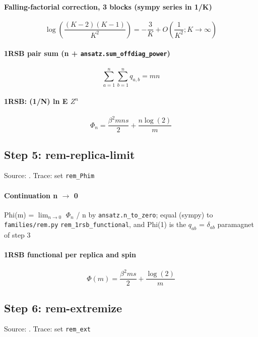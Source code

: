 \documentclass[11pt]{article}
\begin{document}
\paragraph{Falling-factorial correction, 3 blocks (sympy series in 1/K)}
\begin{equation}
\log{\left(\frac{\left(K - 2\right) \left(K - 1\right)}{K^{2}} \right)} = - \frac{3}{K} + O\left(\frac{1}{K^{2}}; K\rightarrow \infty\right)
\end{equation}
\paragraph{1RSB pair sum (n + \texttt{ansatz.sum\_offdiag\_power})}
\begin{equation}
\sum_{a=1}^{n} \sum_{b=1}^{n} {q}_{a,b} = m n
\end{equation}
\paragraph{1RSB: (1/N) ln E $Z^{n}$}
\begin{equation}
\Phi_{n} = \frac{\beta^{2} m n s}{2} + \frac{n \log{\left(2 \right)}}{m}
\end{equation}
\subsection{Step 5: rem-replica-limit}
Source: \cite{b3,b4}. Trace: set \texttt{rem\_Phim}

\paragraph{Continuation n $\to$ 0}
Phi(m) = $\lim _{n \to 0}$ $\Phi _{n}$ / n by \texttt{ansatz.n\_to\_zero}; equal (sympy) to \texttt{families/rem.py} \texttt{rem\_1rsb\_functional}, and Phi(1) is the $q_{ab}$ = $\delta _{ab}$ paramagnet of step 3
\paragraph{1RSB functional per replica and spin}
\begin{equation}
\Phi{\left(m \right)} = \frac{\beta^{2} m s}{2} + \frac{\log{\left(2 \right)}}{m}
\end{equation}
\subsection{Step 6: rem-extremize}
Source: \cite{b3,b5}. Trace: set \texttt{rem\_ext}
\end{document}
